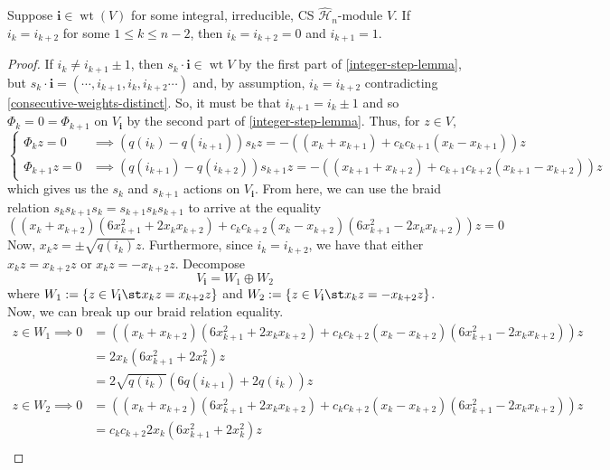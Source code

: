 \documentclass[11pt,leqno,oneside]{amsbook}
\renewcommand{\H}{\mathcal{H}}
\DeclareMathOperator{\wt}{wt}
\renewcommand{\vec}[1]{\mathbf{#1}}
\numberwithin{thm}{section}
\begin{document}
\begin{cor}\label{same-diff-same}
  Suppose \(\vec{i} \in \wt(V)\) for some integral, irreducible, CS
  \(\hat{\H}_n\)-module \(V\). If \(i_k = i_{k+2}\) for some \(1 \leq
  k \leq n-2\), then \(i_k = i_{k+2}=0\) and \(i_{k+1}=1\).
\end{cor}
\begin{proof}
  If \(i_k \neq i_{k+1} \pm 1\), then \(s_k \cdot \vec{i} \in \wt V\) by the first part
  of \ref{integer-step-lemma}, but 
  \(s_k \cdot \vec{i} = (\cdots, i_{k+1},i_k,i_{k+2} \cdots)\) and, by
  assumption, \(i_k = i_{k+2}\) contradicting
  \ref{consecutive-weights-distinct}. So, it must be that \(i_{k+1} =
  i_k \pm 1\) and so \(\Phi_k = 0 = \Phi_{k+1}\) on \(V_{\vec{i}}\) by
  the second part of \ref{integer-step-lemma}. Thus, for \(z \in V\), \[
    \begin{cases}
      \Phi_k z = 0 & \implies (q(i_k)-q(i_{k+1}))s_k z =
      -((x_k+x_{k+1})+c_k c_{k+1}(x_k-x_{k+1}))z \\
      \Phi_{k+1} z = 0 & \implies (q(i_{k+1})-q(i_{k+2}))s_{k+1} z =
      -((x_{k+1}+x_{k+2})+c_{k+1} c_{k+2}(x_{k+1}-x_{k+2}))z
    \end{cases}
  \]
  which gives us the \(s_k\) and \(s_{k+1}\) actions on
  \(V_{\vec{i}}\). From here, we can use the braid relation \(s_k
  s_{k+1} s_k = s_{k+1} s_k s_{k+1}\) to arrive
  at the equality \[
    ((x_k+x_{k+2})(6 x_{k+1}^2 + 2 x_k x_{k+2})+c_k c_{k+2}(x_k -
    x_{k+2})(6 x_{k+1}^2 - 2 x_k x_{k+2}))z = 0
  \]
  Now, \(x_k z = \pm \sqrt{q(i_k)} z\). Furthermore, since \(i_k =
  i_{k+2}\), we have that either \(x_k z = x_{k+2} 
  z\) or \(x_k z = -x_{k+2}z\). Decompose \[
    V_{\vec{i}} = W_1 \oplus W_2
  \]
  where \(W_1 := \{z \in V_{\vec{i}} \st x_k z = x_{k+2} z\}\) and
  \(W_2  := \{z \in V_{\vec{i}} \st x_k z = -x_{k+2} z\}\). Now, we
  can break up our braid relation equality.
  \begin{align*}
    z \in W_1 \implies  0
    &= ((x_k+x_{k+2})(6 x_{k+1}^2 + 2 x_k x_{k+2})+c_k c_{k+2}(x_k -
      x_{k+2})(6 x_{k+1}^2 - 2 x_k x_{k+2}))z\\
    & = 2 x_k (6 x_{k+1}^2 + 2 x_k^2) z \\
    & = 2 \sqrt{q(i_k)}(6 q(i_{k+1})+2q(i_k))z \\
    z \in W_2 \implies 0
    &= ((x_k+x_{k+2})(6 x_{k+1}^2 + 2 x_k x_{k+2})+c_k c_{k+2}(x_k -
      x_{k+2})(6 x_{k+1}^2 - 2 x_k x_{k+2}))z\\
    &= c_k c_{k+2}2 x_k (6 x_{k+1}^2+2x_k^2)z\\

\end{align*}
\end{proof}
\end{document}

